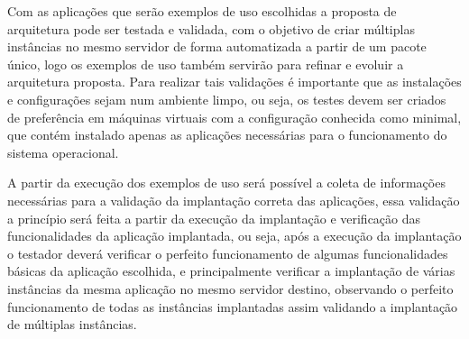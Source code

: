 Com as aplicações que serão exemplos de uso escolhidas a proposta de arquitetura
pode ser testada e validada, com o objetivo de criar múltiplas instâncias
no mesmo servidor de forma automatizada a partir de um pacote único, logo os
exemplos de uso também servirão para refinar e evoluir a arquitetura proposta.
Para realizar tais validações é importante que as instalações e configurações
sejam num ambiente limpo, ou seja, os testes devem ser criados de preferência
em máquinas virtuais com a configuração conhecida como minimal, que contém
instalado apenas as aplicações necessárias para o funcionamento do sistema operacional.

A partir da execução dos exemplos de uso será possível a coleta de informações
necessárias para a validação da implantação correta das aplicações, essa
validação a princípio será feita a partir da execução da implantação e
verificação das funcionalidades da aplicação implantada, ou seja,
após a execução da implantação o testador deverá verificar o perfeito
funcionamento de algumas funcionalidades básicas da aplicação escolhida,
e principalmente verificar a implantação de várias instâncias da mesma
aplicação no mesmo servidor destino, observando o perfeito funcionamento de todas as
instâncias implantadas assim validando a implantação de múltiplas instâncias.
